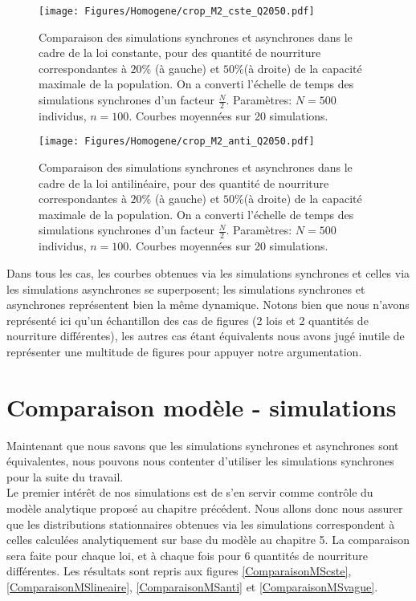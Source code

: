 \begin{figure}[h]
\centering
\texttt{[image: Figures/Homogene/crop\_M2\_cste\_Q2050.pdf]}
\caption{Comparaison des simulations synchrones et asynchrones dans le cadre de la loi constante, pour des quantité de nourriture correspondantes à $20\%$ (à gauche) et $50\%$(à droite) de la capacité maximale de la population. On a converti l'échelle de temps des simulations synchrones d'un facteur $\frac{N}{2}$. Paramètres: $N=500$ individus, $n = 100$. Courbes moyennées sur 20 simulations.}
\label{EquivalenceCste}
\end{figure}

\begin{figure}[h]
\centering
\texttt{[image: Figures/Homogene/crop\_M2\_anti\_Q2050.pdf]}
\caption{Comparaison des simulations synchrones et asynchrones dans le cadre de la loi antilinéaire, pour des quantité de nourriture correspondantes à $20\%$ (à gauche) et $50\%$(à droite) de la capacité maximale de la population. On a converti l'échelle de temps des simulations synchrones d'un facteur $\frac{N}{2}$. Paramètres: $N=500$ individus, $n = 100$. Courbes moyennées sur 20 simulations.}
\label{EquivalenceAnti}
\end{figure}


Dans tous les cas, les courbes obtenues via les simulations synchrones et celles via les simulations asynchrones se superposent; les simulations synchrones et asynchrones représentent bien la même dynamique. Notons bien que nous n'avons représenté ici qu'un échantillon des cas de figures (2 lois et 2 quantités de nourriture différentes), les autres cas étant équivalents nous avons jugé inutile de représenter une multitude de figures pour appuyer notre argumentation.

\section{Comparaison modèle - simulations}

Maintenant que nous savons que les simulations synchrones et asynchrones sont équivalentes, nous pouvons nous contenter d'utiliser les simulations synchrones pour la suite du travail. \\

Le premier intérêt de nos simulations est de s'en servir comme contrôle du modèle analytique proposé au chapitre précédent. Nous allons donc nous assurer que les distributions stationnaires obtenues via les simulations correspondent à celles calculées analytiquement sur base du modèle au chapitre 5. La comparaison sera faite pour chaque loi, et à chaque fois pour 6 quantités de nourriture différentes. Les résultats sont repris aux figures \ref{ComparaisonMScste}, \ref{ComparaisonMSlineaire}, \ref{ComparaisonMSanti} et \ref{ComparaisonMSvague}.

